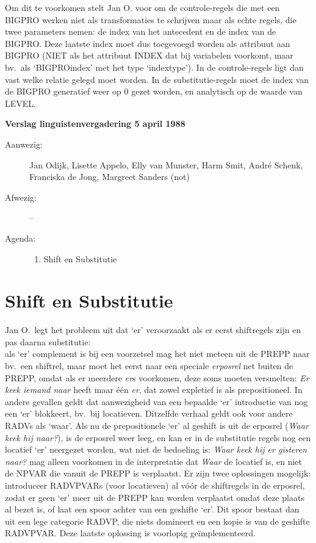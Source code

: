 Om dit te voorkomen stelt Jan O. voor om de controle-regels die met een BIGPRO 
werken niet als transformaties te schrijven maar als echte regels, die twee 
parameters nemen: de index van het antecedent en de 
index van de BIGPRO. Deze laatste index moet dus toegevoegd worden als 
attribuut aan BIGPRO (NIET als het attribuut INDEX dat bij variabelen voorkomt, 
maar bv.\ als `BIGPROindex'
met het type `indextype'). In de controle-regels ligt dan vast welke relatie 
gelegd moet worden.
In de substitutie-regels moet de index van de BIGPRO generatief weer op 0 gezet 
worden, en analytisch op de waarde van LEVEL.

\newpage
\noindent
{\bf Verslag linguistenvergadering 5 april 1988}
\begin{description}
\item[Aanwezig:] Jan Odijk, Lisette Appelo, Elly van Munster, Harm Smit, 
Andr\'{e} Schenk, Franciska de Jong, Margreet Sanders (not)
\item[Afwezig:] --
\item[Agenda:] \mbox{}
\begin{enumerate}
\item Shift en Substitutie
\end{enumerate}
\end{description}

\section{Shift en Substitutie}
Jan O.\ legt het probleem uit dat `er' veroorzaakt als er eerst shiftregels 
zijn en pas daarna substitutie:\\
als `er' complement is bij een voorzetsel mag het niet meteen uit de PREPP naar 
bv.\ een shiftrel, maar moet het eerst naar een speciale {\em erposrel\/} net buiten 
de PREPP, omdat als 
er meerdere {\em er\/}s voorkomen, deze soms moeten versmelten: {\em Er keek 
iemand naar\/}
heeft maar \'{e}\'{e}n {\em er\/}, dat zowel expletief is als 
prepositioneel. In andere gevallen geldt dat aanwezigheid van een bepaalde `er' 
introductie van nog een `er' blokkeert, bv.\ bij locatieven. Ditzelfde verhaal 
geldt ook voor andere RADVs als `waar'. Als nu 
de prepositionele `er' al geshift is uit de erposrel ({\em Waar keek hij 
naar?}), is de erposrel 
weer leeg, en kan er in de substitutie regels nog een locatief `er' neergezet 
worden, wat niet de bedoeling is:
{\em Waar keek hij er gisteren naar?\/} mag alleen voorkomen in de 
interpretatie dat {\em Waar\/} de locatief is, en niet de NPVAR die 
vanuit de PREPP 
is verplaatst. Er zijn twee oplossingen mogelijk: introduceer RADVPVARs (voor 
locatieven) al v\'{o}\'{o}r 
de shiftregels in de erposrel, zodat er geen `er' meer uit de PREPP kan worden 
verplaatst omdat deze plaats al bezet is, of laat een spoor achter van een 
geshifte `er'. Dit spoor bestaat dan uit een lege categorie RADVP, die niets 
domineert en een kopie is van de geshifte RADVPVAR. Deze laatste oplossing is 
voorlopig 
ge\"{i}mplementeerd. 

